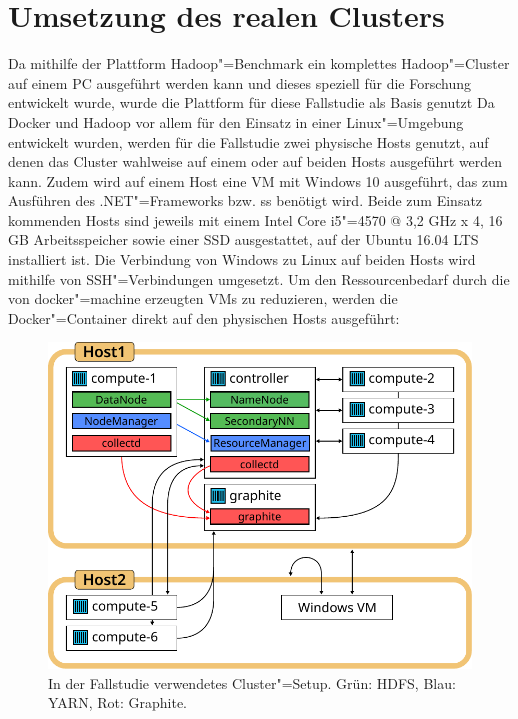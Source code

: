 \section{Umsetzung des realen Clusters}
\label{sec:realCluster}

Da mithilfe der Plattform Hadoop"=Benchmark ein komplettes Hadoop"=Cluster auf einem PC ausgeführt werden kann und dieses speziell für die Forschung entwickelt wurde, wurde die Plattform für diese Fallstudie als Basis genutzt
Da Docker und Hadoop vor allem für den Einsatz in einer Linux"=Umgebung entwickelt wurden, werden für die Fallstudie zwei physische Hosts genutzt, auf denen das Cluster wahlweise auf einem oder auf beiden Hosts ausgeführt werden kann.
Zudem wird auf einem Host eine VM mit Windows 10 ausgeführt, das zum Ausführen des .NET"=Frameworks bzw. \ac{ss} benötigt wird.
Beide zum Einsatz kommenden Hosts sind jeweils mit einem Intel Core i5"=4570 @ 3,2 GHz x 4, 16 GB Arbeitsspeicher sowie einer SSD ausgestattet, auf der Ubuntu 16.04 LTS installiert ist.
Die Verbindung von Windows zu Linux auf beiden Hosts wird mithilfe von SSH"=Verbindungen umgesetzt.
Um den Ressourcenbedarf durch die von docker"=machine erzeugten VMs zu reduzieren, werden die Docker"=Container direkt auf den physischen Hosts ausgeführt:

\begin{figure}[h]
    \includegraphics{./images/caseStudyHadoopSetup.pdf}
    \caption[In der Fallstudie verwendetes Cluster"=Setup]
    {In der Fallstudie verwendetes Cluster"=Setup.
        Grün: \ac{HDFS}, Blau: YARN, Rot: Graphite.}
    \label{fig:caseStudyHadoopSetup}
\end{figure}

